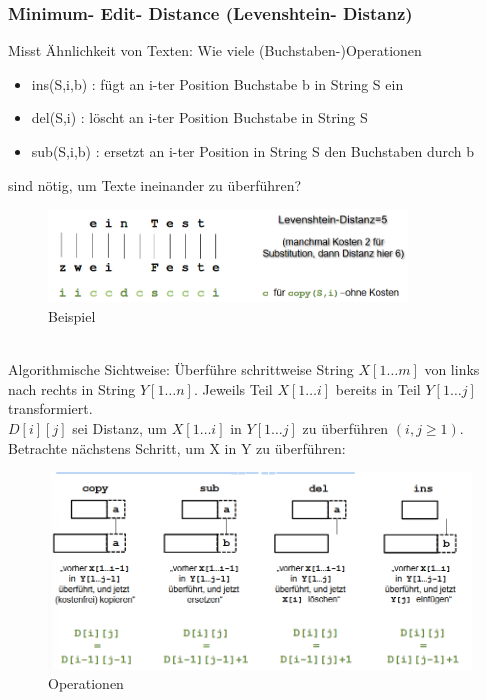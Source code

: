 \documentclass{article}
\begin{document}
            \subsubsection{Minimum- Edit- Distance (Levenshtein- Distanz)}
                Misst Ähnlichkeit von Texten: Wie viele (Buchstaben-)Operationen
                \begin{itemize}
                    \item ins(S,i,b) : fügt an i-ter Position Buchstabe b in String S ein
                    \item del(S,i) : löscht an i-ter Position Buchstabe in String S
                    \item sub(S,i,b) : ersetzt an i-ter Position in String S den Buchstaben durch b
                \end{itemize}
                sind nötig, um Texte ineinander zu überführen?\\
                \begin{figure}[ht]
                    \centering
                    \includegraphics[width=0.85\textwidth]{Bilder/MED.png}
                    \caption{Beispiel}
                    \label{fig:MED}
                \end{figure}\\
                Algorithmische Sichtweise: Überführe schrittweise String $X[1\dots m]$ von links nach rechts in String $Y[1\dots n]$. Jeweils Teil $X[1\dots i]$ bereits in Teil $Y[1\dots j]$ transformiert.\\
                $D[i][j]$ sei Distanz, um $X[1\dots i]$ in $Y[1\dots j]$ zu überführen $(i,j\geq 1)$. \\
                Betrachte nächstens Schritt, um X in Y zu überführen:
                \begin{figure}[ht]
                    \centering
                    \includegraphics[width=1\textwidth]{Bilder/MEDAlg.png}
                    \caption{Operationen}
                    \label{fig:MEDAlg}
                \end{figure}
\end{document}
